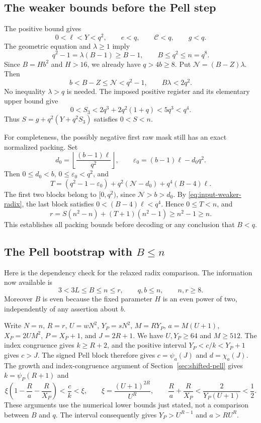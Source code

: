 \subsection{The weaker bounds before the Pell step}

The positive bound gives
\[
 0<\ell<Y<q^2,\qquad e<q,\qquad
 \mathcal C<q,\qquad g<q.
\]
The geometric equation and $\lambda\ge1$ imply
\begin{equation}\label{eq:input-weaker-radix}
 q^2-1=\lambda(B-1)\ge B-1,
 \qquad B\le q^2\le n=q^8.
\end{equation}
Since $B=Hb^2$ and $H>16$, we already have $q>4b\ge8$.
Put $\mathcal N=(B-Z)\lambda$. Then
\[
 b<B-Z\le\mathcal N<q^2-1,
 \qquad B\lambda<2q^2.
\]
No inequality $\lambda>q$ is needed. The imposed positive register
and its elementary upper bound give
\[
 0<S_3<2q^3+2q^2(1+q)<5q^3<q^4.
\]
Thus $S=g+q^2(Y+q^2S_3)$ satisfies $0<S<n$.

For completeness, the possibly negative first raw mask still has
an exact normalized packing. Set
\[
 d_0=\left\lfloor\frac{(b-1)\ell}{q^2}\right\rfloor,
 \qquad \varepsilon_0=(b-1)\ell-d_0q^2.
\]
Then $0\le d_0<b$, $0\le\varepsilon_0<q^2$, and
\[
 T=(q^2-1-\varepsilon_0)
       +q^2(\mathcal N-d_0)+q^4(B-4)\ell.
\]
The first two blocks belong to $[0,q^2)$, since
$\mathcal N>b>d_0$. By \eqref{eq:input-weaker-radix},
the last block satisfies
$0<(B-4)\ell<q^4$. Hence $0\le T<n$, and
\[
 r=S(n^2-n)+(T+1)(n^2-1)\ge n^2-1\ge n.
\]
This establishes all packing bounds before decoding or any conclusion
that $B<q$.

\subsection{The Pell bootstrap with \texorpdfstring{$B\le n$}{B at most n}}

Here is the dependency check for the relaxed radix comparison.
The information now available is
\begin{equation}\label{eq:input-pell-initial}
 3<3L\le B\le n\le r,\qquad q,b\le n,
 \qquad n,r\ge8.
\end{equation}
Moreover $B$ is even because the fixed parameter $H$ is an even
power of two, independently of any assertion about $b$.

Write $N=n$, $R=r$, $U=wN^2$, $Y_P=sN^2$,
$M=RY_P$, $a=M(U+1)$, $X_P=2UM^2$, $P=X_P+1$, and
$J=2R+1$. We have $U,Y_P\ge64$ and $M\ge512$.
The index congruence gives $k\ge R+2$, and the positive interval
$Y_P<c/k<Y_P+1$ gives $c>J$. The signed Pell block therefore
gives $c=\psi_a(J)$ and $d=\chi_a(J)$.
The growth and index-congruence argument of
Section~\ref{sec:shifted-pell} gives $k=\psi_P(R+1)$ and
\[
 \xi\left(1-\frac{R}{a}-\frac{R}{X_P}\right)
       <\frac ck<\xi,
 \qquad \xi=\frac{(U+1)^{2R}}{U^R},
 \qquad \frac{R}{a}+\frac{R}{X_P}
       <\frac{2}{Y_P(U+1)}<\frac12.
\]
These arguments use the numerical lower bounds just stated, not
a comparison between $B$ and $q$. The interval consequently gives
$Y_P>U^{R-1}$ and $a>RU^R$.

